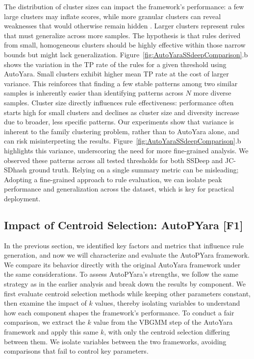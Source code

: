  The distribution of cluster sizes can impact the framework’s performance: a few large clusters may inflate scores, while more granular clusters can reveal weaknesses that would otherwise remain hidden \cite{10.1007/978-3-642-15512-3_13,CORDEIRODEAMORIM2021114971}. Larger clusters represent rules that must generalize across more samples. The hypothesis is that rules derived from small, homogeneous clusters should be highly effective within those narrow bounds but might lack generalization. Figure~\ref{fig:AutoYaraSSdeepComparison}.b shows the variation in the TP rate of the rules for a given threshold using AutoYara. Small clusters exhibit higher mean TP rate at the cost of larger variance. This reinforces that finding a few stable patterns among two similar samples is inherently easier than identifying patterns across $N$ more diverse samples. Cluster size directly influences rule effectiveness: performance often starts high for small clusters and declines as cluster size and diversity increase due to broader, less specific patterns. Our experiments show that variance is inherent to the family clustering problem, rather than to AutoYara alone, and can risk misinterpreting the results. Figure~\ref{fig:AutoYaraSSdeepComparison}.b highlights this variance, underscoring the need for more fine-grained analysis. We observed these patterns across all tested thresholds for both SSDeep and JC-SDhash ground truth. Relying on a single summary metric can be misleading; Adopting a fine-grained approach to rule evaluation, we can isolate peak performance and generalization across the dataset, which is key for practical deployment.


\subsection{Impact of Centroid Selection: AutoPYara [F1]}
\label{subsec:AutoPYaraEval}

 \noindent In the previous section, we identified key factors and metrics that influence rule generation, and now we will characterize and evaluate the AutoPYara framework. We compare its behavior directly with the original AutoYara framework under the same considerations. To assess AutoPYara's strengths, we follow the same strategy as in the earlier analysis and break down the results by component. We first evaluate centroid selection methods while keeping other parameters constant, then examine the impact of $k$ values, thereby isolating variables to understand how each component shapes the framework's performance. To conduct a fair comparison, we extract the $k$ value from the VBGMM step of the AutoYara framework and apply this same $k$, with only the centroid selection differing between them. We isolate variables between the two frameworks, avoiding comparisons that fail to control key parameters.


